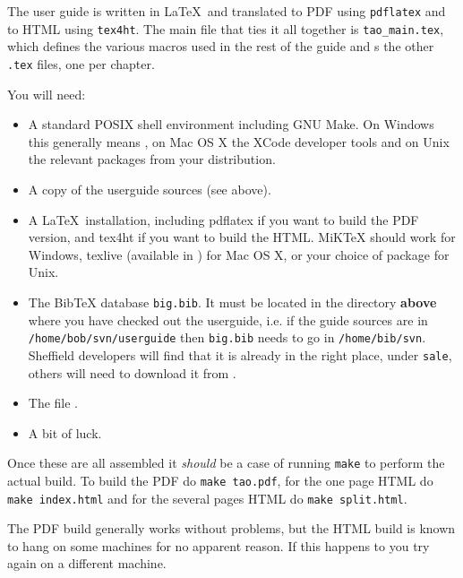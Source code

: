 The user guide is written in \LaTeX\ and translated to PDF using
\texttt{pdflatex} and to HTML using \texttt{tex4ht}.  The main file that ties
it all together is \verb|tao_main.tex|, which defines the various macros used
in the rest of the guide and \verb||s the other \texttt{.tex} files, one
per chapter.


You will need:
\begin{itemize}
\item
A standard POSIX shell environment including GNU Make.  On Windows this
generally means , on Mac OS X the XCode
developer tools and on Unix the relevant packages from your distribution.
\item
A copy of the userguide sources (see above).
\item
A \LaTeX\ installation, including pdflatex if you want to build the PDF
version, and tex4ht if you want to build the HTML.  MiKTeX should work for
Windows, texlive (available in ) for
Mac OS X, or your choice of package for Unix.
\item
The BibTeX database \texttt{big.bib}.  It must be located in the directory
\textbf{above} where you have checked out the userguide, i.e. if the guide
sources are in \verb|/home/bob/svn/userguide| then \texttt{big.bib} needs to go
in \verb|/home/bib/svn|.  Sheffield developers will find that it is already in
the right place, under \texttt{sale}, others will need to download it from
.
\item
The file .
\item
A bit of luck.
\end{itemize}

Once these are all assembled it \emph{should} be a case of running
\texttt{make} to perform the actual build.  To build the PDF do
\texttt{make tao.pdf}, for the one page HTML do \texttt{make index.html} and
for the several pages HTML do \texttt{make split.html}.

The PDF build generally works without problems, but the HTML build is known to
hang on some machines for no apparent reason.  If this happens to you try again
on a different machine.

